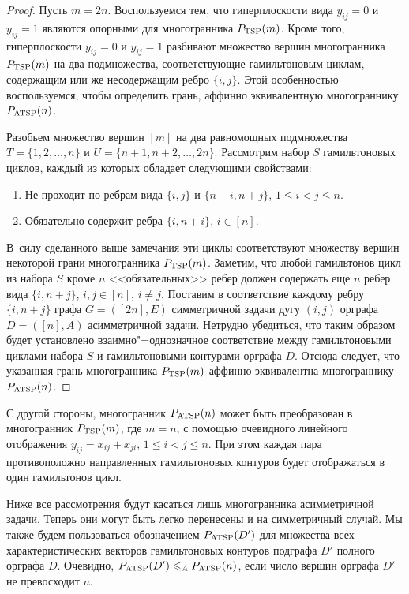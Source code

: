 \begin{proof}
Пусть $m=2n$.
Воспользуемся тем, что гиперплоскости вида $y_{ij}=0$ и $y_{ij}=1$ являются опорными для многогранника $P_{\textup{TSP}}(m)$.
Кроме того, гиперплоскости $y_{ij}=0$ и $y_{ij}=1$ разбивают множество вершин многогранника $P_{\textup{TSP}}(m)$ на два подмножества, соответствующие гамильтоновым циклам, содержащим или же несодержащим ребро $\{i,j\}$.
Этой особенностью воспользуемся, чтобы определить грань, аффинно эквивалентную многограннику $P_{\textup{ATSP}}(n)$.
	
Разобьем множество вершин $[m]$ на два равномощных подмножества $T = \{1, 2, \ldots, n\}$ и $U = \{n+1, n+2, \ldots, 2n\}$.
Рассмотрим набор $S$ гамильтоновых циклов, каждый из которых обладает следующими свойствами:
\begin{enumerate}
	\item Не проходит по ребрам вида $\{i,j\}$ и $\{n+i,n+j\}$, $1\le i < j \le n$.
	\item Обязательно содержит ребра $\{i,n+i\}$, $i \in [n]$.
\end{enumerate}
В~силу сделанного выше замечания эти циклы соответствуют множеству вершин некоторой грани многогранника $P_{\textup{TSP}}(m)$.
Заметим, что любой гамильтонов цикл из набора $S$ кроме $n$ <<обязательных>> ребер должен содержать еще $n$ ребер вида $\{i,n+j\}$, $i, j \in [n]$, $i\neq j$. 
Поставим в соответствие каждому ребру $\{i,n+j\}$ графа $G=([2n],E)$ симметричной задачи дугу $(i,j)$ орграфа $D=([n],A)$ асимметричной задачи.
Нетрудно убедиться, что таким образом будет установлено	взаимно"=однозначное соответствие между гамильтоновыми циклами набора $S$ и гамильтоновыми контурами орграфа $D$.
Отсюда следует, что указанная грань многогранника $P_{\textup{TSP}}(m)$ аффинно эквивалентна многограннику $P_{\textup{ATSP}}(n)$.
\end{proof}

С другой стороны, многогранник $P_{\textup{ATSP}}(n)$ может быть преобразован в многогранник $P_{\textup{TSP}}(m)$,
где $m=n$, с помощью очевидного линейного отображения 
$y_{ij} = x_{ij} + x_{ji}$, $1\le i < j \le n$.
При этом каждая пара противоположно направленных гамильтоновых
контуров будет отображаться в один гамильтонов цикл.

Ниже все рассмотрения будут касаться лишь многогранника асимметричной задачи.
Теперь они могут быть легко перенесены и на симметричный случай.
Мы также будем пользоваться обозначением $P_{\textup{ATSP}}(D')$ для множества всех характеристических векторов гамильтоновых контуров подграфа $D'$ полного орграфа $D$. Очевидно, $P_{\textup{ATSP}}(D') \leqslant_A P_{\textup{ATSP}}(n)$, если число вершин орграфа $D'$ не превосходит $n$.


